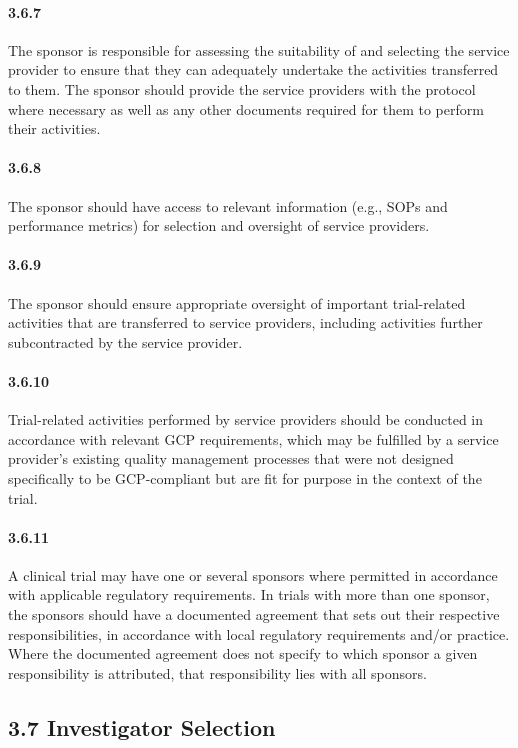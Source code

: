 \documentclass[11pt]{article}
\begin{document}
\paragraph{3.6.7} The sponsor is responsible for assessing the suitability of and selecting the service provider to ensure that they can adequately undertake the activities transferred to them. The sponsor should provide the service providers with the protocol where necessary as well as any other documents required for them to perform their activities.

\paragraph{3.6.8} The sponsor should have access to relevant information (e.g., SOPs and performance metrics) for selection and oversight of service providers.

\paragraph{3.6.9} The sponsor should ensure appropriate oversight of important trial-related activities that are transferred to service providers, including activities further subcontracted by the service provider.

\paragraph{3.6.10} Trial-related activities performed by service providers should be conducted in accordance with relevant GCP requirements, which may be fulfilled by a service provider's existing quality management processes that were not designed specifically to be GCP-compliant but are fit for purpose in the context of the trial.

\paragraph{3.6.11} A clinical trial may have one or several sponsors where permitted in accordance with applicable regulatory requirements. In trials with more than one sponsor, the sponsors should have a documented agreement that sets out their respective responsibilities, in accordance with local regulatory requirements and/or practice. Where the documented agreement does not specify to which sponsor a given responsibility is attributed, that responsibility lies with all sponsors.

\subsection{3.7 Investigator Selection}
\end{document}
